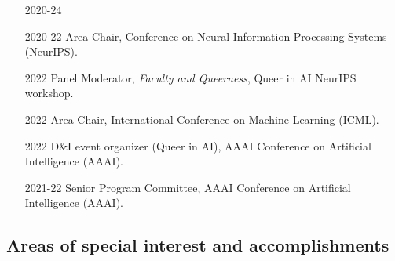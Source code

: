\documentclass[10pt]{article}
\begin{document}
\begin{itemize}[leftmargin=5em]
  \item[2020-24] 
  \item[2020-22] Area Chair, Conference on Neural Information Processing Systems (NeurIPS).
  \item[2022] {Panel Moderator, \emph{Faculty and Queerness}, Queer in AI NeurIPS workshop.}
  \item[2022] {Area Chair, International Conference on Machine Learning (ICML).}
  \item[2022] {D\&I event organizer (Queer in AI), AAAI Conference on Artificial Intelligence (AAAI).}
  \item[2021-22] {Senior Program Committee, AAAI Conference on Artificial Intelligence (AAAI).}
\end{itemize}









\subsection{Areas of special interest and accomplishments}

\end{document}
